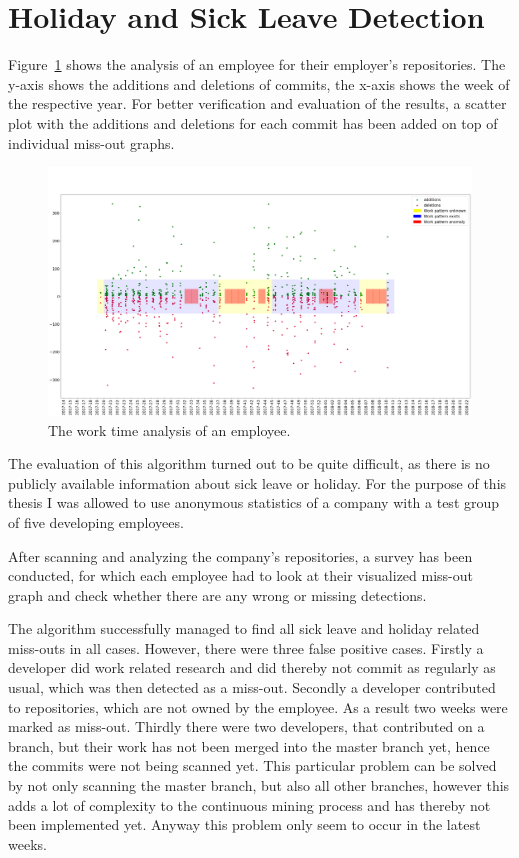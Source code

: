 \section{Holiday and Sick Leave Detection}

Figure~\ref{fig:missing-time} shows the analysis of an employee for their employer's repositories.
The y-axis shows the additions and deletions of commits, the x-axis shows the week of the respective year.
For better verification and evaluation of the results, a scatter plot with the additions and deletions for each commit has been added on top of individual miss-out graphs.

\begin{figure}[H]
    \includegraphics[scale=0.20]{./graphs/analysis/work-time-analysis}
    \centering
    \caption{The work time analysis of an employee.}\label{fig:missing-time}
\end{figure}

The evaluation of this algorithm turned out to be quite difficult, as there is no publicly available information about sick leave or holiday.
For the purpose of this thesis I was allowed to use anonymous statistics of a company with a test group of five developing employees.

After scanning and analyzing the company's repositories, a survey has been conducted, for which each employee had to look at their visualized miss-out graph and check whether there are any wrong or missing detections.

The algorithm successfully managed to find all sick leave and holiday related miss-outs in all cases.
However, there were three false positive cases.
Firstly a developer did work related research and did thereby not commit as regularly as usual, which was then detected as a miss-out.
Secondly a developer contributed to repositories, which are not owned by the employee.
As a result two weeks were marked as miss-out.
Thirdly there were two developers, that contributed on a branch, but their work has not been merged into the master branch yet, hence the commits were not being scanned yet.
This particular problem can be solved by not only scanning the master branch, but also all other branches, however this adds a lot of complexity to the continuous mining process and has thereby not been implemented yet.
Anyway this problem only seem to occur in the latest weeks.

